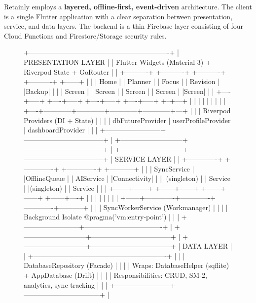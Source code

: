 \documentclass[12pt,a4paper,openany]{report}
\begin{document}
Retainly employs a \textbf{layered, offline-first, event-driven} architecture. The client is a single Flutter application with a clear separation between presentation, service, and data layers. The backend is a thin Firebase layer consisting of four Cloud Functions and Firestore/Storage security rules.

\begin{figure}[H]
\centering
\begin{blockverbatim}
+-------------------------------------------------------------+
|                      PRESENTATION LAYER                     |
|  Flutter Widgets (Material 3) + Riverpod State + GoRouter   |
|  +----------+ +----------+ +----------+ +----------+ +------+ |
|  |   Home   | | Planner  | |  Focus   | | Revision | |Backup| |
|  | Screen   | | Screen   | | Screen   | | Screen   | |Screen| |
|  +----+-----+ +----+-----+ +----+-----+ +----+-----+ +--+---+ |
|       |            |            |            |            |    |
|  +----+------------+------------+------------+------------+---+ |
|  |              Riverpod Providers (DI + State)             | |
|  | dbFutureProvider | userProfileProvider | dashboardProvider | |
|  +------------------------+-----------------------------------+ |
+---------------------------+-----------------------------------+
                            |
+---------------------------+-----------------------------------+
|                        SERVICE LAYER                         |
|  +-------------+ +-------------+ +-------------+ +-----------+ |
|  | SyncService | |OfflineQueue | |  AIService  | |Connectivity| |
|  |(singleton)  | |  Service    | |(singleton)  | | Service    | |
|  +------+------+ +------+------+ +------+------+ +------+----+ |
|         |             |             |             |           |
|  +------+-------------+-------------+-------------+-----------+ |
|  |              SyncWorkerService (Workmanager)              | |
|  |        Background Isolate @pragma('vm:entry-point')       | |
|  +------------------------+----------------------------------+ |
+---------------------------+-----------------------------------+
                            |
+---------------------------+-----------------------------------+
|                         DATA LAYER                            |
|  +----------------------------------------------------------+  |
|  |                  DatabaseRepository (Facade)             |  |
|  | Wraps: DatabaseHelper (sqflite) + AppDatabase (Drift)    |  |
|  | Responsibilities: CRUD, SM-2, analytics, sync tracking   |  |
|  +------------------------+---------------------------------+  |

\end{blockverbatim}
\end{figure}
\end{document}

